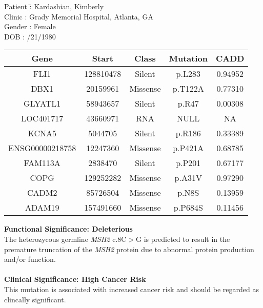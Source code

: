 \documentclass[11pt]{article}\usepackage[]{graphicx}\usepackage[]{color}
\newenvironment{knitrout}{}{} %
\begin{document}

\begin{tabbing}
  \= Patient \= : \= Kardashian, Kimberly \\
  \> Clinic \> : \> Grady Memorial Hospital, Atlanta, GA \\
  \> Gender \> : \> Female \\
  \> DOB \> : /21/1980 \\
\end{tabbing}

\noindent
{} 
\newline

\begin{knitrout}
\color{fgcolor}
\begin{tabular}{c|c|c|c|c}
\hline
Gene & Start & Class & Mutation & CADD\\
\hline
FLI1 & 128810478 & Silent & p.L283 & 0.94952\\
\hline
DBX1 & 20159961 & Missense & p.T122A & 0.77310\\
\hline
GLYATL1 & 58943657 & Silent & p.R47 & 0.00308\\
\hline
LOC401717 & 43660971 & RNA & NULL & NA\\
\hline
KCNA5 & 5044705 & Silent & p.R186 & 0.33389\\
\hline
ENSG00000218758 & 12247360 & Missense & p.P421A & 0.68785\\
\hline
FAM113A & 2838470 & Silent & p.P201 & 0.67177\\
\hline
COPG & 129252282 & Missense & p.A31V & 0.97290\\
\hline
CADM2 & 85726504 & Missense & p.N8S & 0.13959\\
\hline
ADAM19 & 157491660 & Missense & p.P684S & 0.11456\\
\hline
\end{tabular}


\end{knitrout}

\noindent
{}
\textbf{Functional Significance: Deleterious} \\
The heterozycous germline \textit{MSH2} c.8C$>$G is predicted to result in the premature truncation of the \textit{MSH2} protein due to abnormal protein production and/or function. \\ \\
\textbf{Clinical Significance: High Cancer Risk} \\
This mutation is associated with increased cancer risk and should be regarded as clincally significant. \\
\end{document}
